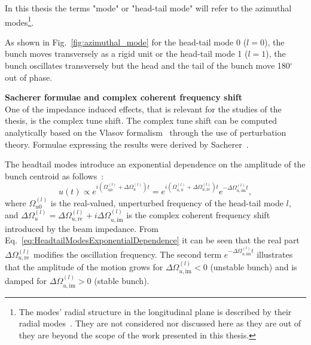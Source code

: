 In this thesis the terms "mode" or "head-tail mode" will refer to the azimuthal modes\footnote{The modes' radial structure in the longitudinal plane is described by their radial modes~\cite{Chao:collective}. They are not considered nor discussed here as they are out of they are beyond the scope of the work presented in this thesis.}. 

As shown in Fig.~\ref{fig:azimuthal_mode} for the head-tail mode 0 ($l=0$), the bunch moves transversely as a rigid unit or the head-tail mode 1 ($l=1$), the bunch oscillates transversely but the head and the tail of the bunch move 180$^\circ$ out of phase. %

\textbf{Sacherer formulae and complex coherent frequency shift}\\
One of the impedance induced effects, that is relevant for the studies of the thesis, is the complex tune shift. The complex tune shift can be computed analytically based on the Vlasov formalism~\cite{Vlasov:426186} through the use of perturbation theory. Formulae expressing the results were derived by Sacherer~\cite{Sacherer:322545, Sacherer:322645}. %

The headtail modes introduce an exponential dependence on the amplitude of the bunch centroid as follows~\cite{Schenk:2665819}:
\begin{equation}\label{eq:HeadtailModesExponentialDependence}
    u(t) \propto e^{i(\Omega_{u0}^{(l)}+\Delta \Omega_u^{(l)})t} =  e^{i(\Omega_{u,0}^{(l)}+\Delta \Omega_{u, \mathrm{{re}}}^{(l)})t} e^{-\Delta \Omega_{u, \mathrm{{im}}}^{(l)} t},
\end{equation}
where $\Omega_{u0}^{(l)}$ is the real-valued, unperturbed frequency of the head-tail mode $l$, and $\Delta \Omega_u ^{(l)} = \Delta \Omega_{u, \mathrm{re}}^{(l)} + i \Delta \Omega_{u, \mathrm{im}}^{(l)}$ is the complex coherent frequency shift introduced by the beam impedance. From Eq.~\eqref{eq:HeadtailModesExponentialDependence} it can be seen that the real part $\Delta \Omega_{u, \mathrm{re}}^{(l)}$ modifies the oscillation frequency. The second term $e^{-\Delta \Omega_{u, \mathrm{im}}^{(l)}t}$ illustrates that the amplitude of the motion grows for $\Delta \Omega_{u, \mathrm{im}}^{(l)}<0$ (unstable bunch) and is damped for $\Delta \Omega_{u, \mathrm{im}}^{(l)}>0$ (stable bunch).


